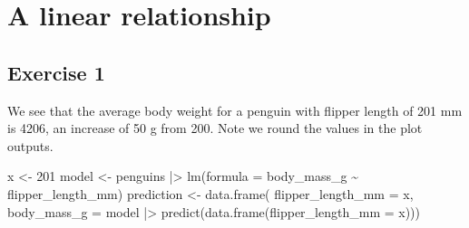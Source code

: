 \documentclass[
  letterpaper,
  DIV=11,
  numbers=noendperiod]{scrreprt}
\newenvironment{Shaded}{\begin{snugshade}}{\end{snugshade}}
\newcommand{\AttributeTok}[1]{\textcolor[rgb]{0.40,0.45,0.13}{#1}}
\newcommand{\DecValTok}[1]{\textcolor[rgb]{0.68,0.00,0.00}{#1}}
\newcommand{\FunctionTok}[1]{\textcolor[rgb]{0.28,0.35,0.67}{#1}}
\newcommand{\NormalTok}[1]{\textcolor[rgb]{0.00,0.23,0.31}{#1}}
\newcommand{\OtherTok}[1]{\textcolor[rgb]{0.00,0.23,0.31}{#1}}
\newcommand{\SpecialCharTok}[1]{\textcolor[rgb]{0.37,0.37,0.37}{#1}}
\begin{document}
\section{A linear relationship}\label{a-linear-relationship-1}

\subsection{Exercise 1}\label{exercise-1-22}

We see that the average body weight for a penguin with flipper length of
201 mm is 4206, an increase of 50 g from 200. Note we round the values
in the plot outputs.

\begin{Shaded}
\begin{Highlighting}[]
\NormalTok{x }\OtherTok{\textless{}{-}} \DecValTok{201}
\NormalTok{model }\OtherTok{\textless{}{-}}\NormalTok{ penguins }\SpecialCharTok{|\textgreater{}} 
  \FunctionTok{lm}\NormalTok{(}\AttributeTok{formula =}\NormalTok{ body\_mass\_g }\SpecialCharTok{\textasciitilde{}}\NormalTok{ flipper\_length\_mm)}
\NormalTok{prediction }\OtherTok{\textless{}{-}} \FunctionTok{data.frame}\NormalTok{(}
  \AttributeTok{flipper\_length\_mm =}\NormalTok{ x,}
  \AttributeTok{body\_mass\_g =}\NormalTok{ model }\SpecialCharTok{|\textgreater{}} \FunctionTok{predict}\NormalTok{(}\FunctionTok{data.frame}\NormalTok{(}\AttributeTok{flipper\_length\_mm =}\NormalTok{ x)))}


\end{Highlighting}
\end{Shaded}
\end{document}

